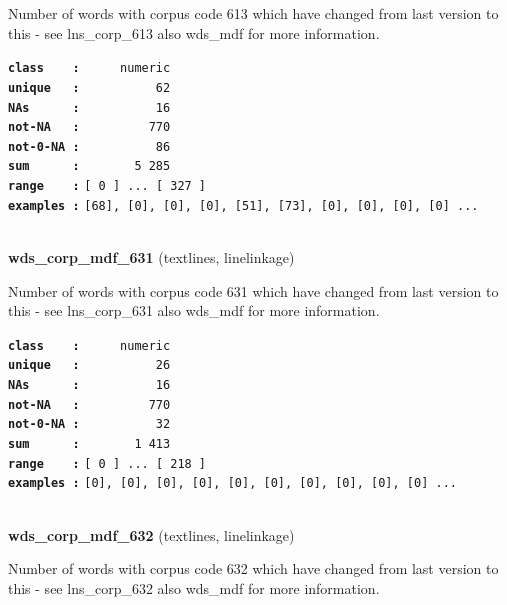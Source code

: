 \documentclass[]{article}
\begin{document}
Number of words with corpus code 613 which have changed from last
version to this - see lns\_corp\_613 also wds\_mdf for more information.

\textbf{\texttt{class\ \ \ \ :}} \texttt{~~~~~numeric}\\
\textbf{\texttt{unique\ \ \ :}} \texttt{~~~~~~~~~~62}\\
\textbf{\texttt{NAs\ \ \ \ \ \ :}} \texttt{~~~~~~~~~~16}\\
\textbf{\texttt{not-NA\ \ \ :}} \texttt{~~~~~~~~~770}\\
\textbf{\texttt{not-0-NA\ :}} \texttt{~~~~~~~~~~86}\\
\textbf{\texttt{sum\ \ \ \ \ \ :}} \texttt{~~~~~~~5~285}\\
\textbf{\texttt{range\ \ \ \ :}}
\texttt{{[}\ 0\ {]}\ ...\ {[}\ 327\ {]}}\\
\textbf{\texttt{examples\ :}}
\texttt{{[}68{]},\ {[}0{]},\ {[}0{]},\ {[}0{]},\ {[}51{]},\ {[}73{]},\ {[}0{]},\ {[}0{]},\ {[}0{]},\ {[}0{]}\ ...}\\

~

\textbf{wds\_corp\_mdf\_631} (textlines, linelinkage)

Number of words with corpus code 631 which have changed from last
version to this - see lns\_corp\_631 also wds\_mdf for more information.

\textbf{\texttt{class\ \ \ \ :}} \texttt{~~~~~numeric}\\
\textbf{\texttt{unique\ \ \ :}} \texttt{~~~~~~~~~~26}\\
\textbf{\texttt{NAs\ \ \ \ \ \ :}} \texttt{~~~~~~~~~~16}\\
\textbf{\texttt{not-NA\ \ \ :}} \texttt{~~~~~~~~~770}\\
\textbf{\texttt{not-0-NA\ :}} \texttt{~~~~~~~~~~32}\\
\textbf{\texttt{sum\ \ \ \ \ \ :}} \texttt{~~~~~~~1~413}\\
\textbf{\texttt{range\ \ \ \ :}}
\texttt{{[}\ 0\ {]}\ ...\ {[}\ 218\ {]}}\\
\textbf{\texttt{examples\ :}}
\texttt{{[}0{]},\ {[}0{]},\ {[}0{]},\ {[}0{]},\ {[}0{]},\ {[}0{]},\ {[}0{]},\ {[}0{]},\ {[}0{]},\ {[}0{]}\ ...}\\

~

\textbf{wds\_corp\_mdf\_632} (textlines, linelinkage)

Number of words with corpus code 632 which have changed from last
version to this - see lns\_corp\_632 also wds\_mdf for more information.
\end{document}
